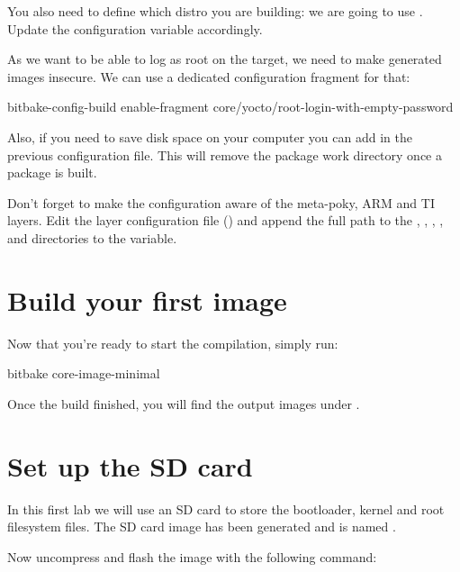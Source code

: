 You also need to define which distro you are building: we are going to use
.
Update the  configuration variable accordingly.

As we want to be able to log as root on the target, we need to make generated
images insecure. We can use a dedicated configuration fragment for that:
\begin{bashinput}
bitbake-config-build enable-fragment core/yocto/root-login-with-empty-password
\end{bashinput}

Also, if you need to save disk space on your computer you can add  in the previous configuration file. This will remove the
package work directory once a package is built.

Don't forget to make the configuration aware of the meta-poky, ARM and TI layers.
Edit the layer configuration file () and
append the full path to the
,
,
,
,
and 
directories to the  variable.

\section{Build your first image}

Now that you're ready to start the compilation, simply run:
\begin{bashinput}
bitbake core-image-minimal
\end{bashinput}

Once the build finished, you will find the output images under
.

\section{Set up the SD card}

In this first lab we will use an SD card to store the bootloader, kernel and
root filesystem files. The SD card image has been generated and is
named .

Now uncompress and flash the image with the following command:

